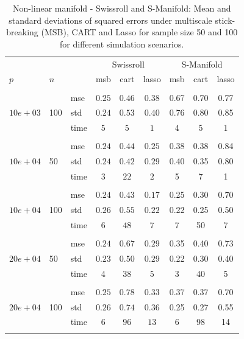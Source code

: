 \documentclass{article} %
\begin{document}
\begin{table}[t]
\caption{Non-linear manifold - Swissroll and S-Manifold: Mean and standard deviations of squared errors under multiscale stick-breaking (MSB), CART and Lasso for sample size 50 and 100 for different simulation scenarios.}\label{table:swiss}
\vskip 0.15in
\begin{center}
\begin{small}
\begin{sc}
\begin{tabular}{lllcccccc}
\hline
&&&\multicolumn{3}{c}{Swissroll}&\multicolumn{3}{c}{S-Manifold}\\

$p$&$n$& & msb&cart& lasso & msb&cart& lasso\\
\\
\multirow{3}{*}{$10e+03$}&\multirow{3}{*}{100}&mse &$0.25$&$0.46$&$0.38$&0.67&0.70&0.77\\
&&std & $0.24$ & $0.53$&$0.40$&0.76&0.80&0.85\\
&&time & 5& $5$&$1$&4 & 5 & 1 \\

\\
\multirow{3}{*}{$10e+04$}&\multirow{3}{*}{50}&mse &$0.24$&$0.44$&$0.25$&0.38&0.38&0.84\\
&&std & $0.24$ & $0.42$&$0.29$&0.40&0.35&0.80\\
&&time & 3 & $22$&$2$ &5&7&1\\

\\
\multirow{3}{*}{$10e+04$}&\multirow{3}{*}{100}&mse &$0.24$ & $0.43$&$0.17$&0.25&0.30&0.70\\
&&std & $0.26$&$0.55$&$0.22$&0.22 & 0.25 &0.50\\
&&time&$6$&$48$&$7$&7 & 50 & 7\\

\\

\multirow{3}{*}{$20e+04$}&\multirow{3}{*}{50}&mse &$0.24$&$0.67$&$0.29$&0.35&0.40&0.73\\
&&std & $0.23$ & $0.50$& $0.29$&0.22&0.30 &0.40\\
&&time & 4& $38$& $5$ & 3 & 40 & 5 \\
\\
\multirow{3}{*}{$20e+04$}&\multirow{3}{*}{100}&mse &$0.25$&$0.78$&$0.33$&0.37&0.37&0.70\\
&&std & $0.26$ & $0.74$&$0.36$&0.25&0.27&0.55\\
&&time &6 &$96$&$13$ &6&98&14\\
\\


\end{tabular}
\end{sc}
\end{small}
\end{center}
\end{table}
\end{document}
